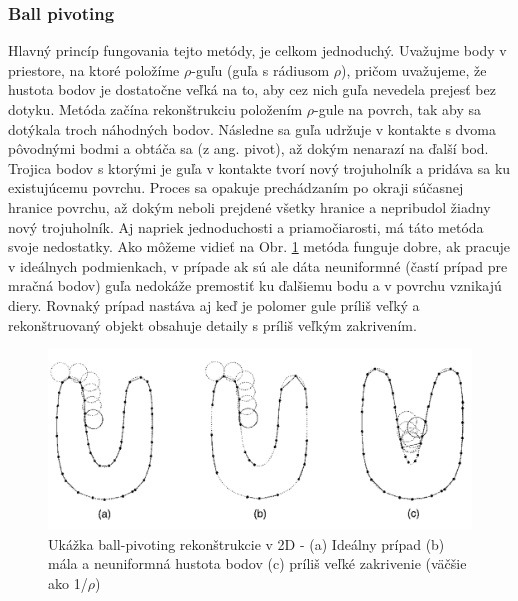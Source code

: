 \subsubsection{Ball pivoting}
\noindent Hlavný princíp fungovania tejto metódy, je celkom jednoduchý. Uvažujme body v priestore, na ktoré položíme $\rho$-guľu (guľa s rádiusom $\rho$), pričom uvažujeme, že hustota bodov je dostatočne veľká na to, aby cez nich guľa nevedela prejesť bez dotyku. Metóda začína rekonštrukciu položením $\rho$-gule na povrch, tak aby sa dotýkala troch náhodných bodov. Následne sa guľa udržuje v kontakte s dvoma pôvodnými bodmi a obtáča sa (z ang. pivot), až dokým nenarazí na ďalší bod. Trojica bodov s ktorými je guľa v kontakte tvorí nový trojuholník a pridáva sa ku existujúcemu povrchu. Proces sa opakuje prechádzaním po okraji súčasnej hranice povrchu, až dokým neboli prejdené všetky hranice a nepribudol žiadny nový trojuholník. \cite{ball_pivot_origin}
\newline\indent Aj napriek jednoduchosti a priamočiarosti, má táto metóda svoje nedostatky. Ako môžeme vidieť na Obr. \ref{fig:ball_pivot} metóda funguje dobre, ak pracuje v ideálnych podmienkach, v prípade ak sú ale dáta neuniformné (častí prípad pre mračná bodov) guľa nedokáže premostiť ku ďalšiemu bodu a v povrchu vznikajú diery. Rovnaký prípad nastáva aj keď je polomer gule príliš veľký a rekonštruovaný objekt obsahuje detaily s príliš veľkým zakrivením.
\begin{figure}[!htbp]
  \centering
  \includegraphics[width=16cm]{img/ball_pivoting.png}
  \caption{Ukážka ball-pivoting rekonštrukcie v 2D - (a) Ideálny prípad (b) mála a neuniformná hustota bodov (c) príliš veľké zakrivenie (väčšie ako 1/$\rho$) \cite{poisson_origin}} 
  \label{fig:ball_pivot}
\end{figure} 

